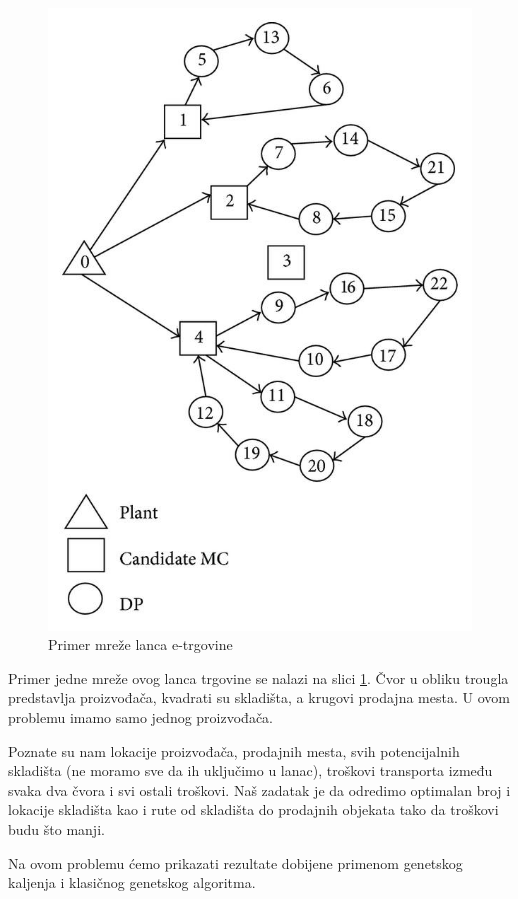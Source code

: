 \documentclass[a4paper]{article}
\begin{document}
\begin{figure}[h!]
\centering
\includegraphics[scale=0.25]{LIRP_Primer_Grafa.jpg}
\caption{Primer mreže lanca e-trgovine}
\label{fig:2}
\end{figure}
\newpage
Primer jedne mreže ovog lanca trgovine se nalazi na slici \ref{fig:2}. Čvor u obliku trougla predstavlja proizvođača, kvadrati su skladišta, a krugovi prodajna mesta. U ovom problemu imamo samo jednog proizvođača. \par
Poznate su nam lokacije proizvođača, prodajnih mesta, svih potencijalnih skladišta (ne moramo sve da ih uključimo u lanac), troškovi transporta između svaka dva čvora i svi ostali troškovi. Naš zadatak je da odredimo optimalan broj i lokacije skladišta kao i rute od skladišta do prodajnih objekata tako da troškovi budu što manji. \par
Na ovom problemu ćemo prikazati rezultate dobijene primenom genetskog kaljenja i klasičnog genetskog algoritma. \\  \par
\end{document}
